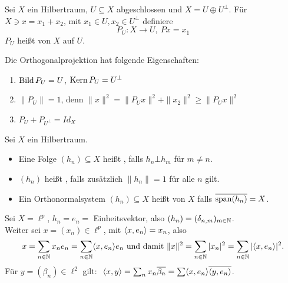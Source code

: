 \begin{definition*}
	Sei $X$ ein Hilbertraum, $U \subseteq X$ abgeschlossen und $X = U \oplus U^{\bot}$. Für $X \ni x = x_{1} + x_{2}$, mit $x_{1} \in U, x_{2} \in U^{\bot}$ definiere
		\[ P_{U} \colon X \rightarrow U, ~ P x = x_{1} \]
		$P_{U}$ hei{\ss}t  von $X$ auf $U$.	
\end{definition*}


\begin{folgerung} \label{folg-16.4}
	Die Orthogonalprojektion hat folgende Eigenschaften:
	\begin{enumerate}[label=\alph*\upshape)]
		\item $\mathop{\rm Bild}\nolimits P_{U} = U$, $\mathop{\rm Kern}\nolimits P_{U} = U^{\bot}$
		\item $\| P_{U} \| = 1$, denn $\| x \|^{2} = \| P_{U} x \|^{2} + \| x_{2} \|^{2} \geq \| P_{U} x \|^{2}$
		\item $P_{U} + P_{U^{\bot}} = Id_{X}$
	\end{enumerate}	
\end{folgerung}

\begin{definition}
	Sei $X$ ein Hilbertraum.
	\begin{itemize}
		\item Eine Folge $(h_{n}) \subseteq X$ hei{\ss}t , falls $h_{n} \bot h_{m}$ für $m \neq n$.
		\item $(h_{n})$ hei{\ss}t , falls zusätzlich $\| h_{n} \| = 1$ für alle $n$ gilt.
		\item Ein Orthonormalsystem $(h_{n}) \subseteq X$ hei{\ss}t  von $X$ falls $\overline{\operatorname{span}(h_{n})} = X$.
	\end{itemize}
\end{definition}


\begin{beispiel}
	Sei $X = \ell^{p}$, $h_{n} = e_{n} =$ Einheitsvektor, also $(h_{n}) = ( \delta_{n, m} )_{m \in \mathbb{N}}$. \\
	Weiter sei $x = (x_{n}) \in \ell^{p}$, mit $\langle x , e_{n} \rangle = x_{n}$, also 
	\[ x = \sum_{n \in \mathbb{N}} x_{n} e_{n} = \sum_{n \in \mathbb{N}} \langle x , e_{n} \rangle e_{n} \text{ und damit } \| x \|^{2} = \sum_{n \in \mathbb{N}} |x_{n}|^{2} = \sum_{n \in \mathbb{N}} | \langle x , e_{n} \rangle |^{2}. \]
	Für $y = (\beta_{n}) \in \ell^{2}$ gilt: $ $ $\langle x , y \rangle = \sum_{n} x_{n} \overline{\beta_{n}} = \sum \langle x , e_{n} \rangle \overline{ \langle y , e_{n} \rangle }$.
\end{beispiel}



